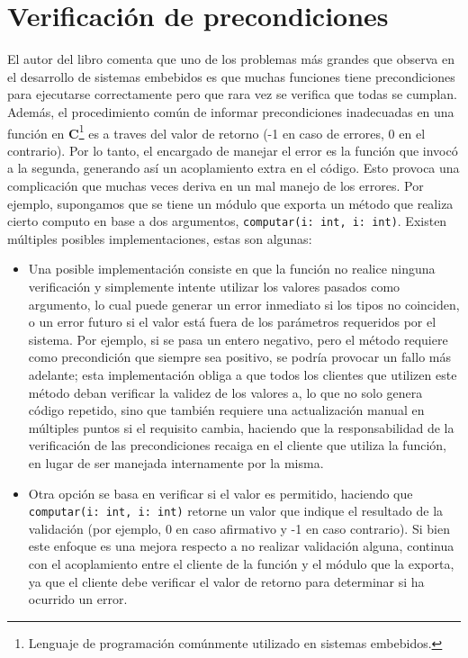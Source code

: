 \section{Verificación de precondiciones}
El autor del libro \cite{douglass} comenta que uno de los problemas más grandes que observa en el desarrollo de sistemas embebidos es que muchas funciones tiene precondiciones para ejecutarse correctamente pero que rara vez se verifica que todas se cumplan. Además, el procedimiento común de informar precondiciones inadecuadas en una función en \textbf{C}\footnote{Lenguaje de programación comúnmente utilizado en sistemas embebidos.} es a traves del valor de retorno (-1 en caso de errores, 0 en el contrario). Por lo tanto, el encargado de manejar el error es la función que invocó a la segunda, generando así un acoplamiento extra en el código. Esto provoca una complicación que muchas veces deriva en un mal manejo de los errores. Por ejemplo, supongamos que se tiene un módulo que exporta un método que realiza cierto computo en base a dos argumentos, \verb|computar(i: int, i: int)|. Existen múltiples posibles implementaciones, estas son algunas:
\begin{itemize}
    \item Una posible implementación consiste en que la función no realice ninguna verificación y simplemente intente utilizar los valores pasados como argumento, lo cual puede generar un error inmediato si los tipos no coinciden, o un error futuro si el valor está fuera de los parámetros requeridos por el sistema. Por ejemplo, si se pasa un entero negativo, pero el método requiere como precondición que siempre sea positivo, se podría provocar un fallo más adelante; esta implementación obliga a que todos los clientes que utilizen este método deban verificar la validez de los valores a, lo que no solo genera código repetido, sino que también requiere una actualización manual en múltiples puntos si el requisito cambia, haciendo que la responsabilidad de la verificación de las precondiciones recaiga en el cliente que utiliza la función, en lugar de ser manejada internamente por la misma.
    \item Otra opción se basa en verificar si el valor es permitido, haciendo que \verb|computar(i: int, i: int)| retorne un valor que indique el resultado de la validación (por ejemplo, 0 en caso afirmativo y -1 en caso contrario). Si bien este enfoque es una mejora respecto a no realizar validación alguna, continua con el acoplamiento entre el cliente de la función y el módulo que la exporta, ya que el cliente debe verificar el valor de retorno para determinar si ha ocurrido un error.
\end{itemize}

